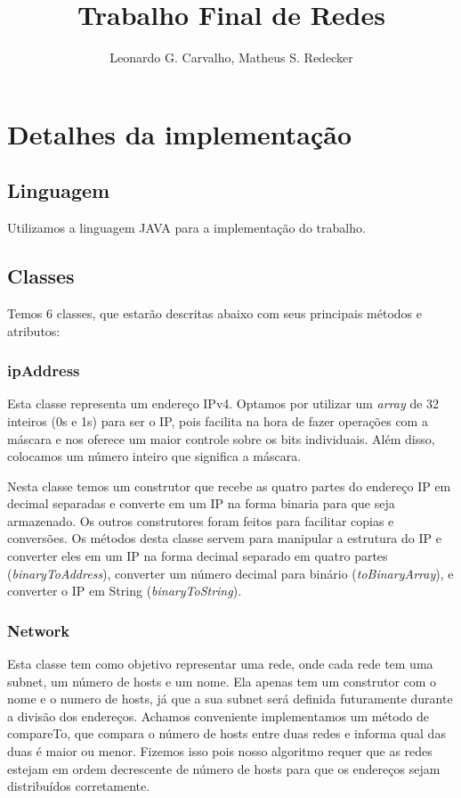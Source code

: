 \documentclass[12pt]{article}
\title{Trabalho Final de Redes}
\author{Leonardo G. Carvalho, Matheus S. Redecker}
\begin{document}
 

\maketitle

\section{Detalhes da implementação}

\subsection {Linguagem}
Utilizamos a linguagem JAVA para a implementação do trabalho.

\subsection{Classes}
Temos 6 classes, que estarão descritas abaixo com seus principais métodos e atributos:

\subsubsection{ipAddress}
Esta classe representa um endereço IPv4. Optamos por utilizar um \textit{array} de 32 inteiros (0s e 1s) para ser o IP, pois facilita na hora de fazer operações com a máscara e nos oferece um maior controle sobre os bits individuais. Além disso, colocamos um número inteiro que significa a máscara.

Nesta classe temos um construtor que recebe as quatro partes do endereço IP em decimal separadas e converte em um IP na forma binaria para que seja armazenado. Os outros construtores foram feitos para facilitar copias e conversões. Os métodos desta classe servem para manipular a estrutura do IP e converter eles em um IP na forma decimal separado em quatro partes (\textit{binaryToAddress}), converter um número decimal para binário (\textit{toBinaryArray}), e converter o IP em String (\textit{binaryToString}).

\subsubsection{Network}
Esta classe tem como objetivo representar uma rede, onde cada rede tem uma subnet, um número de hosts e um nome. Ela apenas tem um construtor com o nome e o numero de hosts, já que a sua subnet será definida futuramente durante a divisão dos endereços. Achamos conveniente implementamos um método de compareTo, que compara o número de hosts entre duas redes e informa qual das duas é maior ou menor. Fizemos isso pois nosso algoritmo requer que as redes estejam em ordem decrescente de número de hosts para que os endereços sejam distribuídos corretamente.
\end{document}
